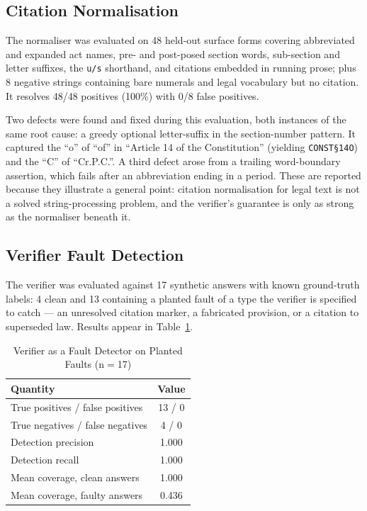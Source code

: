 \documentclass[conference]{IEEEtran}
\begin{document}
\subsection{Citation Normalisation}

The normaliser was evaluated on 48 held-out surface forms covering abbreviated
and expanded act names, pre- and post-posed section words, sub-section and
letter suffixes, the \texttt{u/s} shorthand, and citations embedded in running
prose; plus 8 negative strings containing bare numerals and legal vocabulary but
no citation. It resolves 48/48 positives (100\%) with 0/8 false positives.

Two defects were found and fixed during this evaluation, both instances of the
same root cause: a greedy optional letter-suffix in the section-number pattern.
It captured the ``o'' of ``of'' in ``Article 14 of the Constitution'' (yielding
\texttt{CONST\S14O}) and the ``C'' of ``Cr.P.C.''. A third defect arose from a
trailing word-boundary assertion, which fails after an abbreviation ending in a
period. These are reported because they illustrate a general point: citation
normalisation for legal text is not a solved string-processing problem, and the
verifier's guarantee is only as strong as the normaliser beneath it.

\subsection{Verifier Fault Detection}

The verifier was evaluated against 17 synthetic answers with known ground-truth
labels: 4 clean and 13 containing a planted fault of a type the verifier is
specified to catch --- an unresolved citation marker, a fabricated provision, or
a citation to superseded law. Results appear in Table~\ref{tab:verif}.

\begin{table}[t]
\caption{Verifier as a Fault Detector on Planted Faults (n$=$17)}
\label{tab:verif}
\centering
\footnotesize
\begin{tabular}{@{}lc@{}}
\toprule
\textbf{Quantity} & \textbf{Value} \\
\midrule
True positives / false positives & 13 / 0 \\
True negatives / false negatives & 4 / 0 \\
Detection precision & 1.000 \\
Detection recall & 1.000 \\
\addlinespace
Mean coverage, clean answers & 1.000 \\
Mean coverage, faulty answers & 0.436 \\
\bottomrule
\end{tabular}
\end{table}
\end{document}
